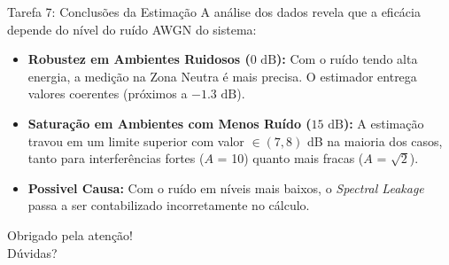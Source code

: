 \documentclass[10pt]{beamer}
\begin{document}
\begin{frame}{Tarefa 7: Conclusões da Estimação}
    A análise dos dados revela que a eficácia depende do nível do ruído AWGN do sistema:
    
    \begin{itemize}
        \item \textbf{Robustez em Ambientes Ruidosos ($0\text{ dB}$):} Com o
            ruído tendo alta energia, a medição na Zona Neutra é mais precisa. O estimador
            entrega valores coerentes (próximos a $-1.3\text{ dB}$).
        \item \textbf{Saturação em Ambientes com Menos Ruído ($15\text{ dB}$):} A 
            estimação travou em um limite superior com valor $\in (7, 8)$
            dB na maioria dos casos, tanto para interferências fortes ($A$ =
            10) quanto mais fracas ($A$ = $\sqrt{2}$).
        \item \textbf{Possivel Causa:} Com o ruído em níveis mais baixos, o 
            \textit{Spectral Leakage} passa a ser contabilizado incorretamente no cálculo.
    \end{itemize}
\end{frame}

\begin{frame}
    \centering
    \Huge Obrigado pela atenção! \\
    \vfill
    \Large Dúvidas?
\end{frame}
\end{document}
